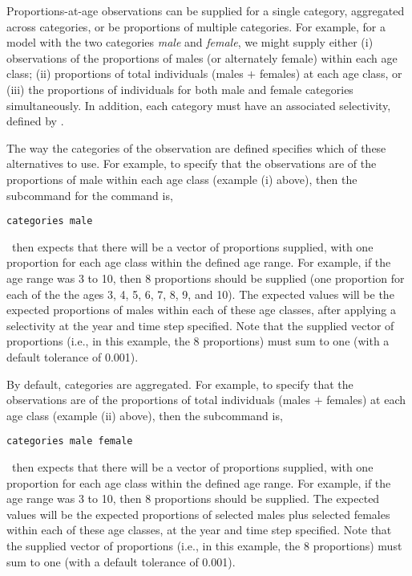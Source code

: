 Proportions-at-age observations can be supplied for a single category, aggregated across categories, or be proportions of multiple categories. For example, for a model with the two categories \emph{male} and \emph{female}, we might supply either (i) observations of the proportions of males (or alternately female) within each age class; (ii) proportions of total individuals (males $+$ females) at each age class, or (iii) the proportions of individuals for both male and female categories simultaneously. In addition, each category must have an associated selectivity, defined by . 

The way the categories of the observation are defined specifies which of these alternatives to use. For example, to specify that the observations are of the proportions of male within each age class (example (i) above), then the subcommand  for the  command is,

\begin{verbatim}
categories male
\end{verbatim}

\SPM\ then expects that there will be a vector of proportions supplied, with one proportion for each age class within the defined age range. For example, if the age range was 3 to 10, then 8 proportions should be supplied (one proportion for each of the the ages 3, 4, 5, 6, 7, 8, 9, and 10). The expected values will be the expected proportions of males within each of these age classes, after applying a selectivity at the year and time step specified. Note that the supplied vector of proportions (i.e., in this example, the 8 proportions) must sum to one (with a default tolerance of 0.001).

By default, categories are aggregated. For example, to specify that the observations are of the proportions of total individuals (males $+$ females) at each age class (example (ii) above), then the subcommand  is,

\begin{verbatim}
categories male female
\end{verbatim}

\SPM\ then expects that there will be a vector of proportions supplied, with one proportion for each age class within the defined age range. For example, if the age range was 3 to 10, then 8 proportions should be supplied. The expected values will be the expected proportions of selected males plus selected females within each of these age classes, at the year and time step specified. Note that the supplied vector of proportions (i.e., in this example, the 8 proportions) must sum to one (with a default tolerance of 0.001).

